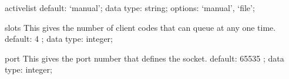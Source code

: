 \begin{ipifield}{}
\begin{ipifield}{activelist}
{{default: `manual'; data type: string; options: `manual', `file'; }%
}
\end{ipifield}
\begin{ipifield}{slots}%
{This gives the number of client codes that can queue at any one time.}%
{default:  4 ; data type: integer; }%
{}
\end{ipifield}
\begin{ipifield}{port}%
{This gives the port number that defines the socket.}%
{default:  65535 ; data type: integer; }%
{}
\end{ipifield}
\end{ipifield}
